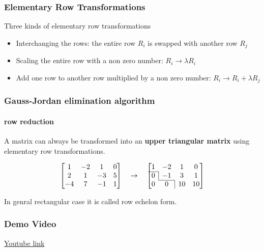 \documentclass[fullscreen=true, bookmarks=true, hyperref={pdfencoding=unicode}]{beamer}
\begin{document}
\begin{frame}
  \frametitle{Elementary Row Transformations}

  Three kinds of elementary row transformations
  \begin{itemize}
    \pause\item Interchanging the rows: 
    the entire row $R_i$ is swapped with another row $R_j$
    \pause\item Scaling the entire row with a non zero number: 
    $R_i \rightarrow \lambda R_i$
    \pause\item Add one row to another row multiplied by a non zero number: 
    $R_i \rightarrow R_i + \lambda R_j$ 
\end{itemize}
\end{frame}


\begin{frame}
  \frametitle{Gauss-Jordan elimination algorithm}
  \framesubtitle{row reduction}
  A matrix can always be transformed into an \textbf{upper triangular matrix}
  using elementary row transformations.

  $$\left[\begin{matrix}
    1 & -2 & 1  & 0 \\
    2 &  1 & -3 & 5 \\
   -4 &  7 & -1 & 1 \\
  \end{matrix}\right]
  \quad \rightarrow \quad
  \left[\begin{matrix}
    1 & -2 & 1 & 0 \\
    \cline{1-1}
    0 & \multicolumn{1}{|c}{-1} & 3 & 1  \\
    \cline{2-2}
    0 & 0 & \multicolumn{1}{|c}{10} & 10 \\
  \end{matrix}\right]$$

  \vspace{1cm}
  In genral rectangular case it is called row echelon form.
\end{frame}


\begin{frame}
  \frametitle{Demo Video}
  
  \href{https://www.youtube.com/watch?v=xivbwsMyorU}{Youtube link}

\end{frame}
\end{document}
